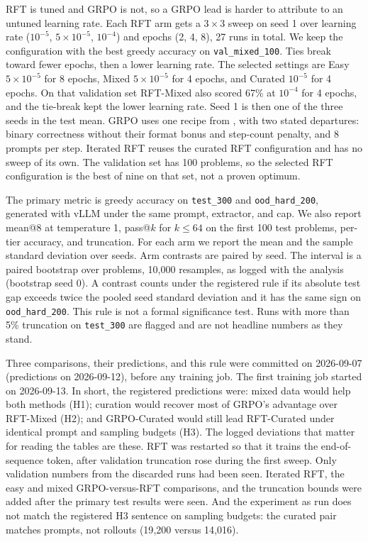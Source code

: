 RFT is tuned and GRPO is not, so a GRPO lead is harder to attribute to an untuned learning rate. Each RFT arm gets a $3{\times}3$ sweep on seed 1 over learning rate ($10^{-5}$, $5{\times}10^{-5}$, $10^{-4}$) and epochs (2, 4, 8), 27 runs in total. We keep the configuration with the best greedy accuracy on \texttt{val\_mixed\_100}. Ties break toward fewer epochs, then a lower learning rate. The selected settings are Easy $5{\times}10^{-5}$ for 8 epochs, Mixed $5{\times}10^{-5}$ for 4 epochs, and Curated $10^{-5}$ for 4 epochs. On that validation set RFT-Mixed also scored 67\% at $10^{-4}$ for 4 epochs, and the tie-break kept the lower learning rate. Seed 1 is then one of the three seeds in the test mean. GRPO uses one recipe from \citet{bauer2026}, with two stated departures: binary correctness without their format bonus and step-count penalty, and 8 prompts per step. Iterated RFT reuses the curated RFT configuration and has no sweep of its own. The validation set has 100 problems, so the selected RFT configuration is the best of nine on that set, not a proven optimum.

The primary metric is greedy accuracy on \texttt{test\_300} and \texttt{ood\_hard\_200}, generated with vLLM under the same prompt, extractor, and cap. We also report mean@8 at temperature 1, pass@$k$ for $k \leq 64$ on the first 100 test problems, per-tier accuracy, and truncation. For each arm we report the mean and the sample standard deviation over seeds. Arm contrasts are paired by seed. The interval is a paired bootstrap over problems, 10{,}000 resamples, as logged with the analysis (bootstrap seed 0). A contrast counts under the registered rule if its absolute test gap exceeds twice the pooled seed standard deviation and it has the same sign on \texttt{ood\_hard\_200}. This rule is not a formal significance test. Runs with more than 5\% truncation on \texttt{test\_300} are flagged and are not headline numbers as they stand.

Three comparisons, their predictions, and this rule were committed on 2026-09-07 (predictions on 2026-09-12), before any training job. The first training job started on 2026-09-13. In short, the registered predictions were: mixed data would help both methods (H1); curation would recover most of GRPO's advantage over RFT-Mixed (H2); and GRPO-Curated would still lead RFT-Curated under identical prompt and sampling budgets (H3). The logged deviations that matter for reading the tables are these. RFT was restarted so that it trains the end-of-sequence token, after validation truncation rose during the first sweep. Only validation numbers from the discarded runs had been seen. Iterated RFT, the easy and mixed GRPO-versus-RFT comparisons, and the truncation bounds were added after the primary test results were seen. And the experiment as run does not match the registered H3 sentence on sampling budgets: the curated pair matches prompts, not rollouts (19{,}200 versus 14{,}016).

